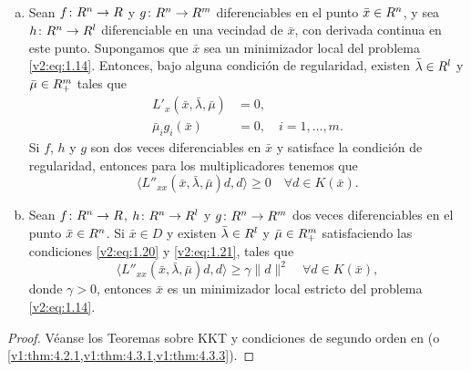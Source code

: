 \begin{theorem}\label{v2:thm:1.2.3}
    \
    \begin{enumerate}[(a)]
        \item Sean $f \colon R^n \to R$ y $g \colon R^n \to R^m$ diferenciables en el punto $\bar{x} \in R^n$, y sea $h \colon R^n \to R^l$ diferenciable en una vecindad de $\bar{x}$, con derivada continua en este punto. Supongamos que $\bar{x}$ sea un minimizador local del problema \eqref{v2:eq:1.14}.
        Entonces, bajo alguna condición de regularidad, existen $\bar{\lambda} \in R^l$ y $\bar{\mu} \in R^m_+$ tales que
        \begin{align}
            L'_x(\bar{x}, \bar{\lambda}, \bar{\mu}) &= 0, \label{v2:eq:1.20} \\
            \bar{\mu}_i g_i(\bar{x}) &= 0, \quad i = 1, \dots, m. \label{v2:eq:1.21}
        \end{align}
        Si $f$, $h$ y $g$ son dos veces diferenciables en $\bar{x}$ y satisface la condición de regularidad, entonces para los multiplicadores tenemos que
        \begin{equation}
            \langle L''_{xx}(\bar{x}, \bar{\lambda}, \bar{\mu})d, d \rangle \ge 0 \quad \forall d \in K(\bar{x}).
            \label{v2:eq:1.22}
        \end{equation}
        
        \item Sean $f \colon R^n \to R$, $h \colon R^n \to R^l$ y $g \colon R^n \to R^m$ dos veces diferenciables en el punto $\bar{x} \in R^n$.
        Si $\bar{x} \in D$ y existen $\bar{\lambda} \in R^l$ y $\bar{\mu} \in R^m_+$ satisfaciendo las condiciones \eqref{v2:eq:1.20} y \eqref{v2:eq:1.21}, tales que
        \begin{equation}
            \langle L''_{xx}(\bar{x}, \bar{\lambda}, \bar{\mu})d, d \rangle \ge \gamma \|d\|^2 \quad \forall d \in K(\bar{x}),
            \label{v2:eq:1.23}
        \end{equation}
        donde $\gamma > 0$, entonces $\bar{x}$ es un minimizador local estricto del problema \eqref{v2:eq:1.14}.
    \end{enumerate}
\end{theorem}

\begin{proof}
    Véanse los Teoremas sobre KKT y condiciones de segundo orden en \cite{izmailov2020otimizacaovolume1} (o \cref{v1:thm:4.2.1,v1:thm:4.3.1,v1:thm:4.3.3}).
\end{proof}

